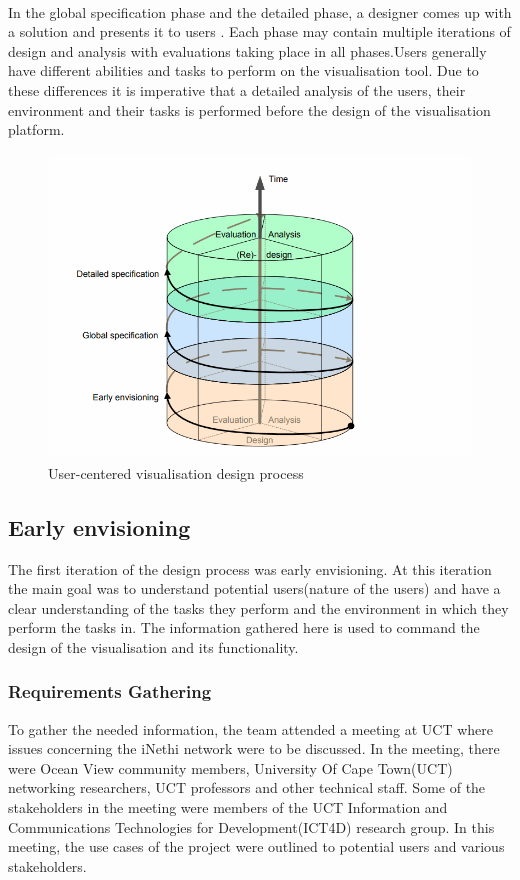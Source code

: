 \paragraph{}
In the global specification phase and the detailed phase, a designer comes up with a solution and presents it to users\cite{Abras04user-centereddesign} \cite{Kulykinbook}. Each phase may contain multiple iterations of design and analysis with evaluations taking place in all phases\cite{Abras04user-centereddesign}.Users generally have different abilities and tasks to perform on the visualisation tool. Due to these differences it is imperative that a detailed analysis of the users, their environment and their tasks is performed before the design of the visualisation platform.
\begin{figure}[b]
	\centering
	\includegraphics[width=0.7\linewidth]{images/img1}
	\caption{User-centered visualisation design process\cite{Abras04user-centereddesign}}
	\label{fig:img1}
\end{figure}



\subsection{Early envisioning}
The first iteration of the design process was early envisioning. At this iteration the main goal was to understand potential users(nature of the users) and have a clear understanding of the tasks they perform and the environment in which they perform the tasks in\cite{Valiati:2006:TTG:1168149.1168169}. The information gathered here is used to command the design of the visualisation and its functionality.

\subsubsection{Requirements Gathering}
To gather the needed information, the team attended a meeting at UCT where issues concerning the iNethi network were to be discussed. In the meeting, there were Ocean View community members, University Of Cape Town(UCT) networking researchers, UCT professors and other technical staff. Some of the stakeholders in the meeting were members of the UCT Information and Communications Technologies for Development(ICT4D) research group. In this meeting, the use cases of the project were outlined to potential users and various stakeholders.
